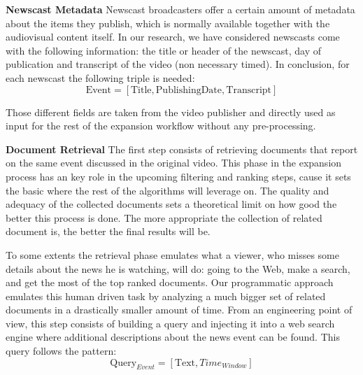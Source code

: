 \documentclass{llncs}
\begin{document}
{\bf Newscast Metadata} %
Newscast broadcasters offer a certain amount of metadata about the items they publish, which is normally available together with the audiovisual content itself. In our research, we have considered newscasts come with the following information: the title or header of the newscast, day of publication and transcript of the video (non necessary timed). In conclusion, for each newscast the following triple is needed:
\begin{equation}
\text{Event} =\left [ \text{Title}, \text{PublishingDate}, \text{Transcript} \right ]
\end{equation}

Those different fields are taken from the video publisher and directly used as input for the rest of the expansion workflow without any pre-processing.

{\bf Document Retrieval}
The first step consists of retrieving documents that report on the same event discussed in the original video. This phase in the expansion process has an key role in the upcoming filtering and ranking steps, cause it sets the basic where the rest of the algorithms will leverage on. The quality and adequacy of the collected documents sets a theoretical limit on how good the better this process is done. The more appropriate the collection of related document is, the better the final results will be.

To some extents the retrieval phase emulates what a viewer, who misses some details about the news he is watching, will do: going to the Web, make a search, and get the most of the top ranked documents. Our programmatic approach emulates this human driven task by analyzing a much bigger set of related documents in a drastically smaller amount of time. From an engineering point of view, this step consists of building a query and injecting it into a web search engine where additional descriptions about the news event can be found. This query follows the pattern:
\begin{equation}
\text{Query}_{Event} =\left [ \text{Text}, Time_{Window} \right ]
\end{equation}
\end{document}
